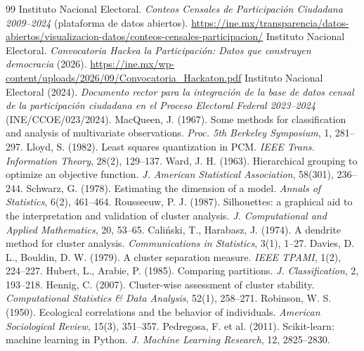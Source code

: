 \documentclass[11pt,letterpaper]{article}
\begin{document}
\begingroup
\small\singlespacing
\setlength{\parskip}{2pt}
\begin{thebibliography}{99}
 Instituto Nacional Electoral. \emph{Conteos Censales de Participaci\'on Ciudadana 2009--2024} (plataforma de datos abiertos). \url{https://ine.mx/transparencia/datos-abiertos/visualizacion-datos/conteos-censales-participacion/}
 Instituto Nacional Electoral. \emph{Convocatoria Hackea la Participaci\'on: Datos que construyen democracia} (2026). \url{https://ine.mx/wp-content/uploads/2026/09/Convocatoria_Hackaton.pdf}
 Instituto Nacional Electoral (2024). \emph{Documento rector para la integraci\'on de la base de datos censal de la participaci\'on ciudadana en el Proceso Electoral Federal 2023--2024} (INE/CCOE/023/2024).
 MacQueen, J. (1967). Some methods for classification and analysis of multivariate observations. \emph{Proc. 5th Berkeley Symposium}, 1, 281--297.
 Lloyd, S. (1982). Least squares quantization in PCM. \emph{IEEE Trans. Information Theory}, 28(2), 129--137.
 Ward, J. H. (1963). Hierarchical grouping to optimize an objective function. \emph{J. American Statistical Association}, 58(301), 236--244.
 Schwarz, G. (1978). Estimating the dimension of a model. \emph{Annals of Statistics}, 6(2), 461--464.
 Rousseeuw, P. J. (1987). Silhouettes: a graphical aid to the interpretation and validation of cluster analysis. \emph{J. Computational and Applied Mathematics}, 20, 53--65.
 Cali\'nski, T., Harabasz, J. (1974). A dendrite method for cluster analysis. \emph{Communications in Statistics}, 3(1), 1--27.
 Davies, D. L., Bouldin, D. W. (1979). A cluster separation measure. \emph{IEEE TPAMI}, 1(2), 224--227.
 Hubert, L., Arabie, P. (1985). Comparing partitions. \emph{J. Classification}, 2, 193--218.
 Hennig, C. (2007). Cluster-wise assessment of cluster stability. \emph{Computational Statistics \& Data Analysis}, 52(1), 258--271.
 Robinson, W. S. (1950). Ecological correlations and the behavior of individuals. \emph{American Sociological Review}, 15(3), 351--357.
 Pedregosa, F. et al. (2011). Scikit-learn: machine learning in Python. \emph{J. Machine Learning Research}, 12, 2825--2830.
\end{thebibliography}
\endgroup
\end{document}
